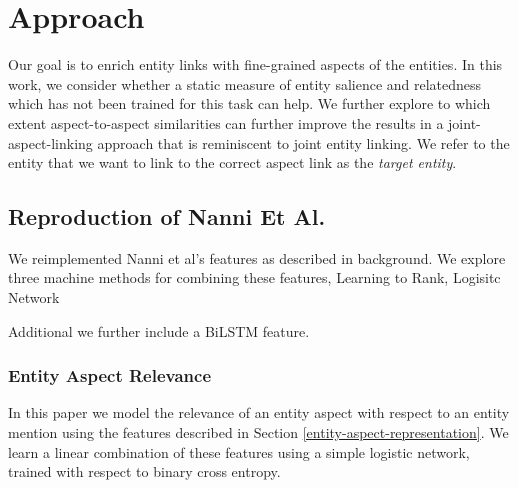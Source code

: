 \section{Approach}
\label{sec:Approach}
Our goal is to enrich entity links with fine-grained aspects of the entities. In this work, we consider whether a static measure of entity salience and relatedness which has not been trained for this task can help. We further explore to which extent aspect-to-aspect similarities can further improve the results in a joint-aspect-linking approach that is reminiscent to joint entity linking.  We refer to the entity that we want to link to the correct aspect link as the \emph{target entity}.




\subsection{Reproduction of Nanni Et Al.}

We reimplemented Nanni et al's features as described in background. We explore three machine methods for combining these features, Learning to Rank, Logisitc Network

Additional we further include a  BiLSTM feature. 



\subsubsection{Entity Aspect Relevance }
In this paper we model the relevance of an entity aspect with respect to an entity mention using the features described in Section \ref{entity-aspect-representation}. We learn a linear combination of these features using a simple logistic network, trained with respect to binary cross entropy.

